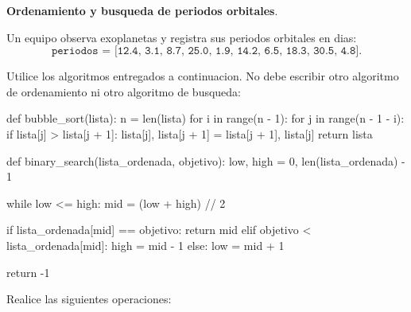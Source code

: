 \providecommand{\Needspace}[1]{}
\Needspace{8\baselineskip}
\item \textbf{Ordenamiento y busqueda de periodos orbitales}.
\nopagebreak[4]

\begin{tcolorbox}[colback=blue!2!white,colframe=blue!55!black,title={Enunciado},
                  before skip=3pt,after skip=5pt,boxsep=3pt,top=3pt,bottom=3pt,
                  breakable]
\small
\raggedright
Un equipo observa exoplanetas y registra sus periodos orbitales en dias:
\[
\texttt{periodos = [12.4,\ 3.1,\ 8.7,\ 25.0,\ 1.9,\ 14.2,\ 6.5,\ 18.3,\ 30.5,\ 4.8]}.
\]

Utilice los algoritmos entregados a continuacion. No debe escribir otro
algoritmo de ordenamiento ni otro algoritmo de busqueda:

\begin{pythonjupyter}
def bubble_sort(lista):
    n = len(lista)
    for i in range(n - 1):
        for j in range(n - 1 - i):
            if lista[j] > lista[j + 1]:
                lista[j], lista[j + 1] = lista[j + 1], lista[j]
    return lista

def binary_search(lista_ordenada, objetivo):
    low, high = 0, len(lista_ordenada) - 1

    while low <= high:
        mid = (low + high) // 2

        if lista_ordenada[mid] == objetivo:
            return mid
        elif objetivo < lista_ordenada[mid]:
            high = mid - 1
        else:
            low = mid + 1

    return -1
\end{pythonjupyter}

Realice las siguientes operaciones:


\end{tcolorbox}
